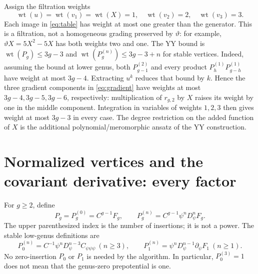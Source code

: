 \documentclass[11pt,a4paper]{article}
\numberwithin{equation}{section}
\newcommand{\tht}{\vartheta}
\newcommand{\del}{\partial}
\newcommand{\Pg}[2]{P_{#1}^{(#2)}}
\newcommand{\wt}{\operatorname{wt}}
\begin{document}
Assign the filtration weights
\begin{equation}
\wt(u)=\wt(v_1)=\wt(X)=1,\quad \wt(v_2)=2,\quad\wt(v_3)=3.
\end{equation}
Each image in \eqref{eq:table} has weight at most one greater than the
generator. This is a filtration, not a homogeneous grading preserved by
$\tht$: for example, $\tht X=5X^2-5X$ has both weights two and one.
The YY bound is $\wt(P_g)\le3g-3$ and
$\wt(\Pg gn)\le3g-3+n$ for stable vertices.
Indeed, assuming the bound at lower genus, both
$\Pg{g-1}2$ and every product $\Pg h1\Pg{g-h}1$ have weight at most
$3g-4$. Extracting $u^k$ reduces that bound by $k$. Hence the three
gradient components in \eqref{eq:gradient} have weights at most
$3g-4,3g-5,3g-6$, respectively: multiplication of $r_{g,2}$ by $X$
raises its weight by one in the middle component. Integration in variables
of weights $1,2,3$ then gives weight at most $3g-3$ in every case.
The degree restriction on the added function of $X$ is the additional
polynomial/meromorphic ansatz of the YY construction.

\section{Normalized vertices and the covariant derivative: every factor}

For $g\ge2$, define
\begin{equation}
P_g=\Pg g0=C^{g-1}F_g,\qquad
\Pg gn=C^{g-1}\psi^n D_\psi^n F_g.
\end{equation}
The upper parenthesized index is the number of insertions; it is not a power.
The stable low-genus definitions are
\begin{equation}
\Pg 0n=C^{-1}\psi^nD_\psi^{n-3}C_{\psi\psi\psi}\ (n\ge3),\qquad
\Pg 1n=\psi^nD_\psi^{n-1}\del_\psi F_1\ (n\ge1).
\end{equation}
No zero-insertion $P_0$ or $P_1$ is needed by the algorithm. In particular,
$\Pg 03=1$ does not mean that the genus-zero prepotential is one.
\end{document}

